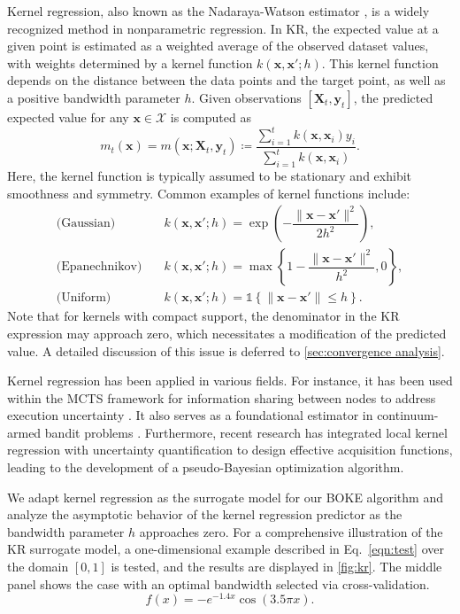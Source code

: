 \documentclass[11pt,en]{elegantpaper}
\newcommand{\domain}{\mathcal{X}}
\newcommand{\X}{\bm{X}}
\newcommand{\x}{\bm{x}}
\newcommand{\y}{\bm{y}}
\newcommand{\1}{\mathds{1}}
\newcommand{\set}[1]{\left\{#1\right\}}
\begin{document}
Kernel regression, also known as the Nadaraya-Watson estimator \cite{nadaraya1964estimating, watson1964smooth}, is a widely recognized method in nonparametric regression. In KR, the expected value at a given point is estimated as a weighted average of the observed dataset values, with weights determined by a kernel function $k(\x, \x'; h)$. This kernel function depends on the distance between the data points and the target point, as well as a positive bandwidth parameter $h$.
Given observations $[\X_t, \y_t]$, the predicted expected value for any $\x \in \domain$ is computed as
\begin{equation}
    \label{eqn:KR}
    m_t(\x) = m(\x; \X_t, \y_t)
    \coloneqq \dfrac{\sum_{i=1}^{t} k(\x, \x_i) y_i}{\sum_{i=1}^{t} k(\x, \x_i)}.
\end{equation}
Here, the kernel function is typically assumed to be stationary and exhibit smoothness and symmetry. Common examples of kernel functions include:
\begin{align}
    \text{(Gaussian)}
    & \quad k(\x, \x'; h) = \exp\left(- \dfrac{\| \x - \x' \|^2}{2 h^2} \right),
    \label{eqn:Gaussian kernel} 
    \\
    \text{(Epanechnikov)}
    & \quad k(\x, \x'; h) = \max\set{1 - \dfrac{\| \x - \x' \|^2}{h^2}, 0},
    \label{eqn:Epanechnikov kernel} 
    \\
    \text{(Uniform)}
    & \quad k(\x, \x'; h) = \1{\set{\| \x - \x' \| \le h}}.
    \label{eqn:Uniform kernel}
\end{align}
Note that for kernels with compact support, the denominator in the KR expression may approach zero, which necessitates a modification of the predicted value. A detailed discussion of this issue is deferred to \cref{sec:convergence analysis}.


Kernel regression has been applied in various fields. For instance, it has been used within the MCTS framework for information sharing between nodes to address execution uncertainty \cite{yee2016monte}. It also serves as a foundational estimator in continuum-armed bandit problems \cite{agrawal1995continuum}. Furthermore, recent research \cite{chen2024pseudo} has integrated local kernel regression with uncertainty quantification to design effective acquisition functions, leading to the development of a pseudo-Bayesian optimization algorithm.


We adapt kernel regression as the surrogate model for our BOKE algorithm and analyze the asymptotic behavior of the kernel regression predictor as the bandwidth parameter $h$ approaches zero. For a comprehensive illustration of the KR surrogate model, a one-dimensional example described in Eq.~\eqref{eqn:test} over the domain $[0, 1]$ is tested, and the results are displayed in \cref{fig:kr}. The middle panel shows the case with an optimal bandwidth selected via cross-validation.
\begin{equation}
    \label{eqn:test}
    f(x) = - e^{-1.4 x} \cos(3.5 \pi x).
\end{equation}
\end{document}
